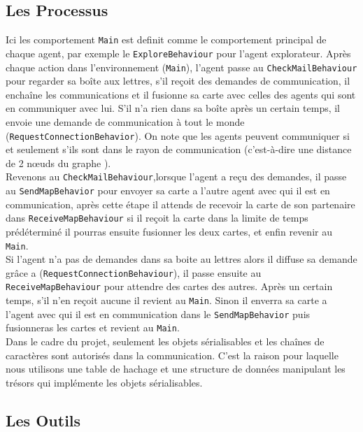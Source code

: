 \documentclass[10pt]{article}
\newcommand\tab[1][0.65cm]{\hspace*{#1}}
\begin{document}
\subsection{Les Processus}
Ici les comportement \texttt{Main} est definit comme le comportement principal de chaque agent, par exemple le \texttt{ExploreBehaviour} pour l'agent explorateur. Après chaque action dans l'environnement (\texttt{Main}), l'agent passe au \texttt{CheckMailBehaviour} pour regarder sa boîte aux lettres, s'il reçoit des demandes de communication, il enchaîne les communications et il fusionne sa carte avec celles des agents qui sont en communiquer avec lui. S'il n'a rien dans sa boîte après un certain temps, il envoie une demande de communication à tout le monde (\texttt{RequestConnectionBehavior}). On note que les agents peuvent communiquer si et seulement s'ils sont dans le rayon de communication (c'est-à-dire une distance de 2 nœuds du graphe ).\\
\tab Revenons au \texttt{CheckMailBehaviour},lorsque l'agent a reçu des demandes, il passe au \texttt{SendMapBehavior} pour envoyer sa carte a l'autre agent avec qui il est en communication, après cette étape il attends de recevoir la carte de son partenaire dans \texttt{ReceiveMapBehaviour} si il reçoit la carte dans la limite de temps prédéterminé il pourras ensuite fusionner les deux cartes, et enfin revenir au \texttt{Main}.\\
\tab Si l'agent n'a pas de demandes dans sa boite au lettres alors il diffuse sa demande grâce a (\texttt{RequestConnectionBehaviour}), il passe ensuite au \texttt{ReceiveMapBehaviour} pour attendre des cartes des autres. Après un certain temps, s'il n'en reçoit aucune il revient au \texttt{Main}. Sinon il enverra sa carte a l'agent avec qui il est en communication dans le \texttt{SendMapBehavior} puis fusionneras les cartes et revient au \texttt{Main}.\\
\tab Dans le cadre du projet, seulement les objets sérialisables et les chaînes de caractères sont autorisés dans la communication. C'est la raison pour laquelle nous utilisons une table de hachage et une structure de données manipulant les trésors qui implémente les objets sérialisables.
\subsection{Les Outils}
\end{document}
